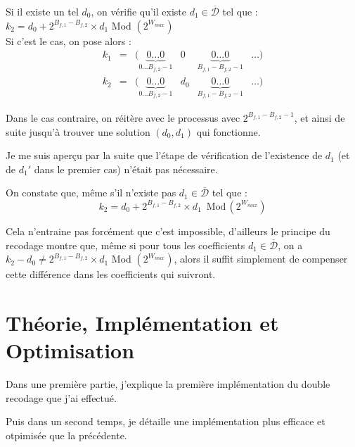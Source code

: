 \documentclass[12pt, a4paper]{memoir}
\newcommand{\dbarre}{\overline{\mathcal{D}}}
\begin{document}
\begin{itemize}
\begin{itemize}
   Si il existe un tel $d_0$, on vérifie qu'il existe $d_1 \in \dbarre$ tel que :
   $k_2 = d_0 + 2^{B_{f,1} - B_{f,2}} \times d_1$ Mod $(2^{W_{max}})$ \\
   
   Si c'est le cas, on pose alors : \\
   $$\begin{array}{cccccc}
   k_1 & = & (\underbrace{0 \ldots 0}_{0 \ldots B_{f,2} - 1} & 0 & \underbrace{0 \ldots 0}_{B_{f,1} - B_{f,2}-1} & \ldots) \\
   k_2 & = & (\underbrace{0 \ldots 0}_{0 \ldots B_{f,2} - 1} & d_0 & \underbrace{0 \ldots 0}_{B_{f,1} - B_{f,2}-1} & \ldots)
   \end{array}$$
   
   Dans le cas contraire, on réitère avec le processus avec $2^{B_{f,1} - B_{f,2} - 1}$, et ainsi de suite jusqu'à trouver une solution $(d_0,d_1)$ qui fonctionne.
   \end{itemize}
  \end{itemize}

\begin{Remarque}
 Je me suis aperçu par la suite que l'étape de vérification de l'existence de $d_1$ (et de $d_1'$ dans le premier cas)
 n'était pas nécessaire.
 
 On constate que, même s'il n'existe pas $d_1 \in \dbarre$ tel que :
 \begin{equation}
    k_2 = d_0 + 2^{B_{f,1} - B_{f,2}} \times d_1 \,\,\, \text{Mod} \, (2^{W_{max}})
 \end{equation}

   Cela n'entraine pas forcément que c'est impossible, d'ailleurs le principe du recodage montre que, même 
   si pour tous les coefficients $d_1 \in \dbarre$, on a $k_2 - d_0 \neq 2^{B_{f,1} - B_{f,2}} \times d_1$ Mod $(2^{W_{max}})$,
   alors il suffit simplement de compenser cette différence dans les coefficients qui suivront.
\end{Remarque}

  

\chapter{Théorie, Implémentation et Optimisation}

Dans une première partie, j'explique la première implémentation du double recodage que j'ai effectué.

Puis dans un second temps, je détaille une implémentation plus efficace et otpimisée que la précédente.
\end{document}
